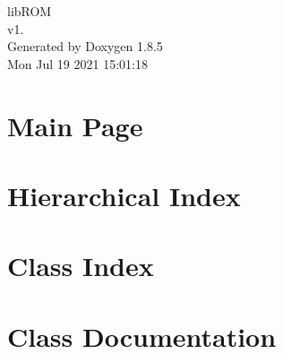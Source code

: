 \documentclass[twoside]{book}
\newcommand{\clearemptydoublepage}{%
  \newpage{\pagestyle{empty}\cleardoublepage}%
}
\begin{document}
\hypersetup{pageanchor=false}
\begin{titlepage}
\vspace*{7cm}
\begin{center}%
{\Large lib\-R\-O\-M \\[1ex]\large v1. }\\
\vspace*{1cm}
{\large Generated by Doxygen 1.8.5}\\
\vspace*{0.5cm}
{\small Mon Jul 19 2021 15:01:18}\\
\end{center}
\end{titlepage}
\clearemptydoublepage
\tableofcontents
\clearemptydoublepage
{}
\hypersetup{pageanchor=true}

\chapter{Main Page}
\label{index}\hypertarget{index}{}
\chapter{Hierarchical Index}

\chapter{Class Index}

\chapter{Class Documentation}





















\newpage
{}
{}
\printindex
\end{document}
